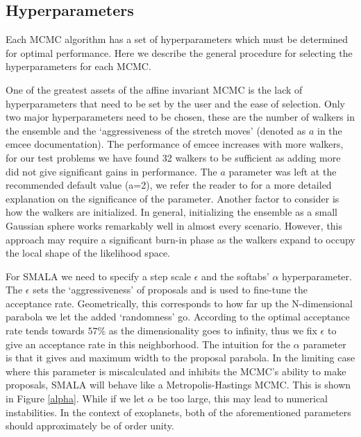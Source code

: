 \documentclass{aa}
\begin{document}
\subsection{Hyperparameters}\label{hyper}
Each MCMC algorithm has a set of hyperparameters which must be determined for optimal performance. Here we describe the general procedure for selecting the hyperparameters for each MCMC.

One of the greatest assets of the affine invariant MCMC is the lack of hyperparameters that need to be set by the user and the ease of selection. Only two major hyperparameters need to be chosen, these are the number of walkers in the ensemble and the `aggressiveness of the stretch moves' (denoted as $a$ in the emcee documentation). The performance of emcee increases with more walkers, for our test problems we have found 32 walkers to be sufficient as adding more did not give significant gains in performance. The $a$ parameter was left at the recommended default value (a=2), we refer the reader to \cite{Foreman-Mackey2013} for a more detailed explanation on the significance of the parameter. Another factor to consider is how the walkers are initialized. In general, initializing the ensemble as a small Gaussian sphere works remarkably well in almost every scenario. However, this approach may require a significant burn-in phase as the walkers expand to occupy the local shape of the likelihood space.

For SMALA we need to specify a step scale $\epsilon$ and the softabs' $\alpha$ hyperparameter. The $\epsilon$ sets the `aggressiveness' of proposals and is used to fine-tune the acceptance rate. Geometrically, this corresponds to how far up the N-dimensional parabola we let the added `randomness' go. According to \cite{robert1998} the optimal acceptance rate tends towards $57\%$ as the dimensionality goes to infinity, thus we fix $\epsilon$ to give an acceptance rate in this neighborhood. The intuition for the $\alpha$ parameter is that it gives and maximum width to the proposal parabola. In the limiting case where this parameter is miscalculated and inhibits the MCMC's ability to make proposals, SMALA will behave like a Metropolis-Hastings MCMC. This is shown in Figure \ref{alpha}. While if we let $\alpha$ be too large, this may lead to numerical instabilities. In the context of exoplanets, both of the aforementioned parameters should approximately be of order unity.
\end{document}
